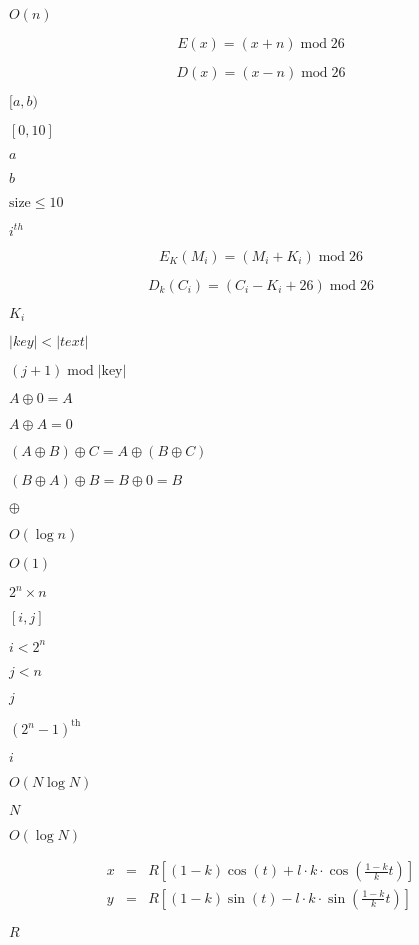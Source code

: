 \documentclass{article}
\begin{document}
$O(n)$
\pagebreak

\[ E(x) = (x + n)\;\mbox{mod}\; 26\]
\pagebreak

\[ D(x) = (x - n) \;\mbox{mod}\; 26\]
\pagebreak

$[a,b)$
\pagebreak

$[0,10]$
\pagebreak

$a$
\pagebreak

$b$
\pagebreak

$\text{size}\le10$
\pagebreak

$i^{th}$
\pagebreak

\[ E_{K}(M_{i}) = (M_{i} + K_{i})\;\mbox{mod}\; 26\]
\pagebreak

\[ D_{k}(C_{i}) = (C_{i} - K_{i} + 26)\;\mbox{mod}\; 26\]
\pagebreak

$K_{i}$
\pagebreak

$|key| < |text|$
\pagebreak

$(j + 1) \;\mbox{mod}\; |\mbox{key}|$
\pagebreak

$A {\oplus} 0 = A$
\pagebreak

$A {\oplus} A = 0$
\pagebreak

$ (A {\oplus} B) {\oplus} C = A {\oplus} (B {\oplus} C)$
\pagebreak

$ (B {\oplus} A) {\oplus} B = B {\oplus} 0 = B $
\pagebreak

$\oplus$
\pagebreak

$O(\log n)$
\pagebreak

$O(1)$
\pagebreak

$2^n\times n$
\pagebreak

$[i, j]$
\pagebreak

$i < 2^n$
\pagebreak

$j < n$
\pagebreak

$j$
\pagebreak

$(2^n - 1)^{\mbox{th}}$
\pagebreak

$i$
\pagebreak

$O(N \log N)$
\pagebreak

$N$
\pagebreak

$O(\log N)$
\pagebreak

\begin{eqnarray*}
x &=& R\left[ (1-k) \cos (t) + l\cdot k\cdot\cos \left(\frac{1-k}{k}t\right)
\right]\\
y &=& R\left[ (1-k) \sin (t) - l\cdot k\cdot\sin \left(\frac{1-k}{k}t\right)
\right] \end{eqnarray*}
\pagebreak

$R$
\pagebreak
\end{document}
